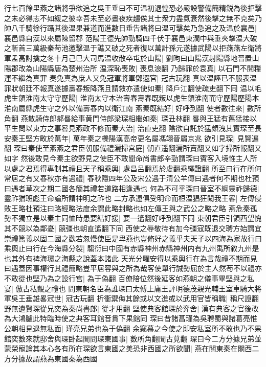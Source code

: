 行七百餘里燕之諸將爭欲追之吳王垂曰不可温初退惶恐必嚴設警備簡精鋭為後拒擊之未必得志不如緩之彼幸吾未至必晝夜疾趨俟其士衆力盡氣衰然後擊之無不克矣乃帥八千騎徐行躡其後温果兼道而進數日垂告諸將曰温可擊矣乃急追之及温於襄邑|{
	襄邑縣自漢以來屬陳留郡}
范陽王德先帥勁騎四千伏于襄邑東澗中與垂夾擊温大破之斬首三萬級秦苟池邀擊温于譙又破之死者復以萬計孫元遂據武陽以拒燕燕左衛將軍孟高討擒之冬十月己巳大司馬温收散卒屯於山陽|{
	劉昫曰山陽漢射陽縣地晉置山陽郡改為山陽縣唐為楚州治所}
温深恥喪敗|{
	喪息浪翻}
乃歸罪於袁真|{
	以石門不開糧運不繼為真罪}
奏免真為庶人又免冠軍將軍鄧遐官|{
	冠古玩翻}
真以温誣已不服表温罪狀朝廷不報真遂據壽春叛降燕且請救亦遣使如秦|{
	降戶江翻使疏吏翻下同}
温以毛虎生領淮南太守守歷陽|{
	淮南太守本治壽春壽春既叛以虎生領淮南而守歷陽歷陽本淮南屬縣虎生守之外以備壽春内以衛江南}
燕秦既結好|{
	好呼到翻}
使者數往來|{
	數所角翻}
燕散騎侍郎郝晷給事黄門侍郎梁琛相繼如秦|{
	琛丑林翻}
晷與王猛有舊猛接以平生問以東方之事晷見燕政不修而秦大治|{
	治直吏翻}
陰欲自託於猛頗洩其實琛至長安秦王堅方畋於萬年|{
	萬年秦之櫟陽漢高帝更名屬馮翊晉屬京兆}
欲引見琛|{
	見賢遍翻}
琛曰秦使至燕燕之君臣朝服備禮灑掃宫庭|{
	朝直遥翻灑所賣翻又如字掃所報翻又如字}
然後敢見今秦主欲野見之使臣不敢聞命尚書郎辛勁謂琛曰賓客入境惟主人所以處之君焉得專制其禮且天子稱乘輿|{
	處昌呂翻焉於䖍翻乘繩證翻}
所至曰行在所何常居之有又春秋亦有遇禮|{
	春秋隱四年公及宋公遇于清公羊傳曰遇者何不期也杜預曰遇者草次之期二國各簡其禮若道路相逢遇也}
何為不可乎琛曰晉室不綱靈祚歸德|{
	靈祚猶班彪王命論所謂神明之祚也}
二方承運俱受明命而桓温猖狂闚我王畧|{
	左傳侵敗王略杜預注曰略經略法度余謂此略封略也如左傳王與之武公之略之略}
燕危秦孤勢不獨立是以秦主同恤時患要結好援|{
	要一遙翻好呼到翻下同}
東朝君臣引領西望愧其不競以為鄰憂|{
	競彊也朝直遙翻下同}
西使之辱敬待有加今彊寇既退交聘方始謂宜崇禮篤義以固二國之歡若忽慢使臣是卑燕也豈脩好之義乎夫天子以四海為家故行曰乘輿止曰行在今海縣分裂|{
	騶衍曰中國有赤縣神州赤縣神州内有九州禹所敘九州是也其外有禆海環之海縣之說蓋本諸此}
天光分曜安得以乘輿行在為言哉禮不期而見曰遇蓋因事權行其禮簡略豈平居容與之所為哉客使單行誠勢屈於主人然苟不以禮亦不敢從也堅乃為之設行宫|{
	為于偽翻}
百僚陪位然後延客如燕朝之儀事畢堅與之私宴|{
	倣古私覿之禮也}
問東朝名臣為誰琛曰太傅上庸王評明德茂親光輔王室車騎大將軍吳王垂雄畧冠世|{
	冠古玩翻}
折衝禦侮其餘或以文進或以武用官皆稱職|{
	稱尺證翻}
野無遺賢琛從兄奕為秦尚書郎|{
	從才用翻}
堅使典客館琛於弈舍|{
	漢有典客之官後改為大鴻臚此特臨時使之典客耳館音貫下果館同}
琛曰昔諸菖瑾為吳聘蜀與諸葛亮惟公朝相見退無私面|{
	瑾亮兄弟也為于偽翻}
余竊慕之今使之即安私室所不敢也乃不果館奕數來就邸舍與琛卧起閒問琛東國事|{
	數所角翻閒古莧翻}
琛曰今二方分據兄弟並蒙榮寵論其本心各有所在琛欲言東國之美恐非西國之所欲聞|{
	燕在關東秦在關西二方分據故謂燕為東國秦為西國}
